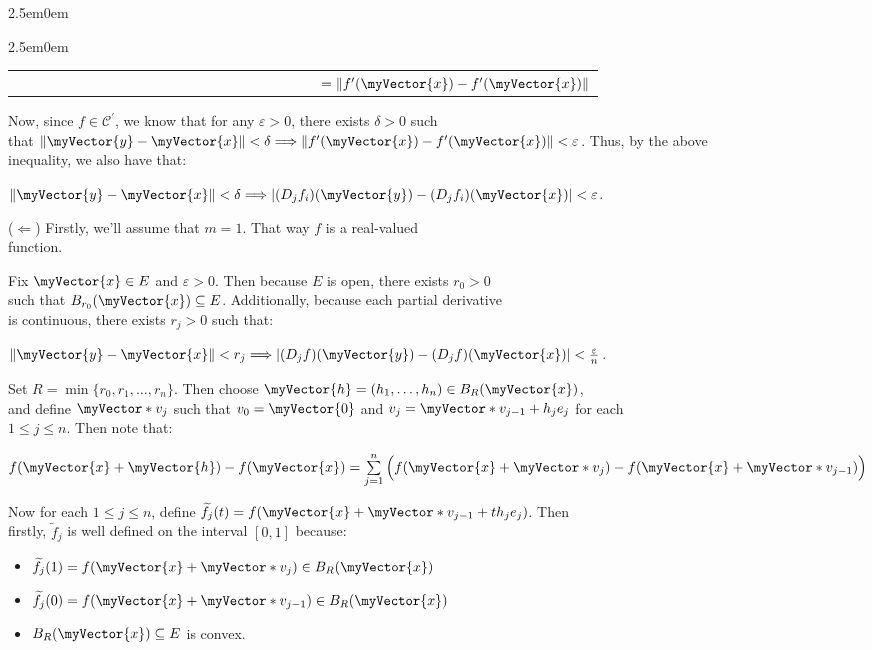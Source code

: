 \documentclass{book}
\newenvironment{myIndent}{%
   \begin{adjustwidth}{2.5em}{0em}%
}{%
   \end{adjustwidth}%
}
\newcommand{\retTwo}{\hfill\bigbreak}
\newcommand{\myVS}{\vphantom{\ensuremath{\int_a^b}}}
\newcommand{\mVec}[1]{\myVector{#1}}
\newcommand{\mVecAst}[1]{\myVector*{#1}}
\begin{document}
{\begin{myIndent}
{\begin{myIndent}
\begin{center}
\begin{tabular}{l}
            $\phantom{|(D_jf_i)(\mVec{y}) - (D_jf_i)(\mVec{x})|} = \|f^\prime(\mVec{x}) - f^\prime(\mVec{x})\|$
         \end{tabular}\retTwo
      \end{center}

      Now, since $f \in \mathscr{C}^\prime$, we know that for any $\varepsilon > 0$, there exists $\delta > 0$ such\\ that $\|\mVec{y} - \mVec{x}\| < \delta \Longrightarrow \|f^\prime(\mVec{x}) - f^\prime(\mVec{x})\| < \varepsilon$. Thus, by the above\\ inequality, we also have that:
      
      {\centering $\|\mVec{y} - \mVec{x}\| < \delta \Longrightarrow |(D_jf_i)(\mVec{y}) - (D_jf_i)(\mVec{x})| < \varepsilon$.\retTwo\par}

      ($\Longleftarrow$) Firstly, we'll assume that $m = 1$. That way $f$ is a real-valued\\ function.\retTwo

      Fix $\mVec{x} \in E$ and $\varepsilon > 0$. Then because $E$ is open, there exists $r_0 > 0$\\ such that $B_{r_0}(\mVec{x}) \subseteq E$. Additionally, because each partial derivative\\ is continuous, there exists $r_j > 0$ such that:
      
      {\centering $\|\mVec{y} - \mVec{x}\| < r_j \Longrightarrow |(D_jf)(\mVec{y}) - (D_jf)(\mVec{x})| < \frac{\varepsilon}{n}$.\retTwo\par}

      Set $R = \min\{r_0, r_1, \ldots, r_n\}$. Then choose $\mVec{h} = (h_1, \ldots, h_n) \in B_R(\mVec{x})$,\\ and define $\mVecAst{v}_j$ such that $v_0 = \mVec{0}$ and $v_j = \mVecAst{v}_{j-1} + h_je_j$ for each\\ $1 \leq j \leq n$. Then note that: 
      \begin{center}
         {\fontsize{12}{14}\selectfont
            $f(\mVec{x} + \mVec{h}) - f(\mVec{x}) = \sum\limits_{j=1}^n\left(\myVS f(\mVec{x} + \mVecAst{v}_j) - f(\mVec{x} + \mVecAst{v}_{j-1})\right)$
         \retTwo}
      \end{center}

      Now for each $1 \leq j \leq n$, define $\widetilde{f}_j(t) = f(\mVec{x} + \mVecAst{v}_{j-1} + th_je_j)$. Then\\ firstly, $\widetilde{f}_j$ is well defined on the interval $[0, 1]$ because:
      \begin{itemize}
         \item $\widetilde{f}_j(1) = f(\mVec{x} + \mVecAst{v}_j) \in B_R(\mVec{x})$
         \item $\widetilde{f}_j(0) = f(\mVec{x} + \mVecAst{v}_{j-1}) \in B_R(\mVec{x})$
         \item $B_R(\mVec{x}) \subseteq E$ is convex.
      \end{itemize}\retTwo


\end{myIndent}}
\end{myIndent}}
\end{document}
